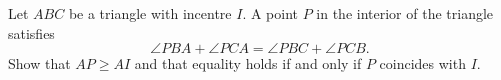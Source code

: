 Let $ABC$ be a triangle with incentre $I$. A point $P$ in the interior of the triangle satisfies
\[
\angle PBA + \angle PCA = \angle PBC + \angle PCB.
\]
Show that $AP \geq AI$ and that equality holds if and only if $P$ coincides with $I$.
